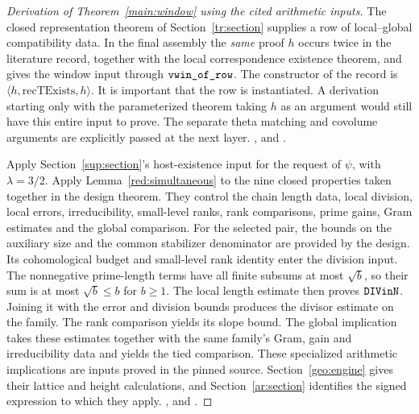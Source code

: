 \begin{proof}[Derivation of Theorem~\ref{main:window} using the cited arithmetic inputs]
The closed representation theorem of Section~\ref{tr:section} supplies a row of local--global compatibility data. In the final assembly the \emph{same} proof \(h\) occurs twice in the literature record, together with the local correspondence existence theorem, and gives the window input through \(\texttt{vwin\_of\_row}\). The constructor of the record is \(\langle h,\mathrm{recTExists},h\rangle\). It is important that the row is instantiated. A derivation starting only with the parameterized theorem taking \(h\) as an argument would still have this entire input to prove. The separate theta matching and covolume arguments are explicitly passed at the next layer. ,  and .

Apply Section~\ref{sup:section}'s host-existence input for the request of \(\psi\), with \(\lambda=3/2\). Apply Lemma~\ref{red:simultaneous} to the nine closed properties taken together in the design theorem. They control the chain length data, local division, local errors, irreducibility, small-level ranks, rank comparisons, prime gains, Gram estimates and the global comparison. For the selected pair, the bounds on the auxiliary size and the common stabilizer denominator are provided by the design. Its cohomological budget and small-level rank identity enter the division input. The nonnegative prime-length terms have all finite subsums at most \(\sqrt b\), so their sum is at most \(\sqrt b\le b\) for \(b\ge1\). The local length estimate then proves \(\texttt{DIVinN}\). Joining it with the error and division bounds produces the divisor estimate on the family. The rank comparison yields its slope bound. The global implication takes these estimates together with the same family's Gram, gain and irreducibility data and yields the tied comparison. These specialized arithmetic implications are inputs proved in the pinned source. Section~\ref{geo:engine} gives their lattice and height calculations, and Section~\ref{ar:section} identifies the signed expression to which they apply. ,  and .


\end{proof}
